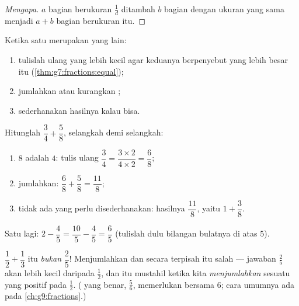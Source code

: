 \begin{proof}[Mengapa]
$a$ bagian berukuran $\frac1d$ ditambah $b$ bagian dengan ukuran yang
sama menjadi $a + b$ bagian berukuran itu.
\end{proof}

\begin{method}\label{met:g7:fractions:add}
Ketika satu  merupakan   yang lain:
\begin{enumerate}
  \item tulislah ulang  yang  lebih kecil agar
        keduanya berpenyebut yang lebih besar itu
        (\cref{thm:g7:fractions:equal});
  \item jumlahkan atau kurangkan ;
  \item sederhanakan hasilnya kalau bisa.
\end{enumerate}
\end{method}

\begin{example}\label{ex:g7:fractions:add}
Hitunglah $\dfrac{3}{4} + \dfrac{5}{8}$, selangkah demi selangkah:
\begin{enumerate}
  \item $8$ adalah  $4$: tulis ulang
        $\dfrac34 = \dfrac{3 \times 2}{4 \times 2} = \dfrac{6}{8}$;
  \item jumlahkan: $\dfrac{6}{8} + \dfrac{5}{8} = \dfrac{11}{8}$;
  \item tidak ada yang perlu disederhanakan: hasilnya
        $\dfrac{11}{8}$, yaitu $1 + \dfrac38$.
\end{enumerate}
Satu lagi: $2 - \dfrac{4}{5} = \dfrac{10}{5} - \dfrac{4}{5} =
\dfrac{6}{5}$ (tulislah dulu bilangan bulatnya di atas 
$5$).
\end{example}

\begin{example}\label{ex:g7:fractions:trap}
$\dfrac12 + \dfrac13$ itu \emph{bukan} $\dfrac{2}{5}$! Menjumlahkan
 dan  secara terpisah itu salah --- jawaban
$\frac25$ akan lebih kecil daripada $\frac12$, dan itu mustahil
ketika kita \emph{menjumlahkan} sesuatu yang positif pada $\frac12$.
( yang benar, $\frac56$, memerlukan  bersama $6$; cara
umumnya ada pada \cref{ch:g9:fractions}.)
\end{example}

